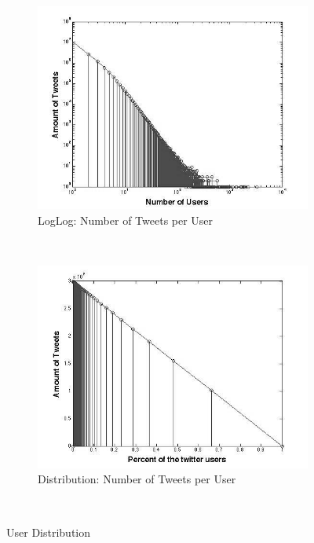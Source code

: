 \begin{figure}
        \centering
        \begin{subfigure}[b]{0.5\textwidth}
                \includegraphics[width=\textwidth]{img/anal/loglog_users_Tweets_1}
                \caption{LogLog: Number of Tweets per User}
                 \label{fig:user_1}
        \end{subfigure}%
        ~ %
        \begin{subfigure}[b]{0.5\textwidth}
                \includegraphics[width=\textwidth]{img/anal/no_power_1}
                \caption{Distribution: Number of Tweets per User}
                \label{fig:user_2}
        \end{subfigure}
        ~ %
      
        \caption{User Distribution}\label{fig:animals}
\end{figure}





